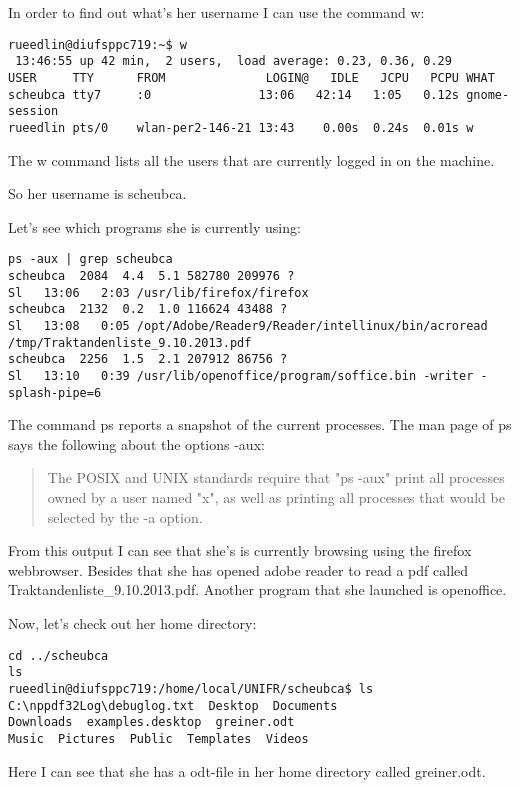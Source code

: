\documentclass[12pt]{article}
\begin{document}
In order to find out what's her username I can use the command w:
\begin{lstlisting}
rueedlin@diufsppc719:~$ w
 13:46:55 up 42 min,  2 users,  load average: 0.23, 0.36, 0.29
USER     TTY      FROM              LOGIN@   IDLE   JCPU   PCPU WHAT
scheubca tty7     :0               13:06   42:14   1:05   0.12s gnome-session
rueedlin pts/0    wlan-per2-146-21 13:43    0.00s  0.24s  0.01s w
\end{lstlisting}

The w command lists all the users that are currently logged in on the machine.

So her username is scheubca.

Let's see which programs she is currently using:

\begin{lstlisting}
ps -aux | grep scheubca
scheubca  2084  4.4  5.1 582780 209976 ?       
Sl   13:06   2:03 /usr/lib/firefox/firefox
scheubca  2132  0.2  1.0 116624 43488 ?        
Sl   13:08   0:05 /opt/Adobe/Reader9/Reader/intellinux/bin/acroread 
/tmp/Traktandenliste_9.10.2013.pdf
scheubca  2256  1.5  2.1 207912 86756 ?        
Sl   13:10   0:39 /usr/lib/openoffice/program/soffice.bin -writer -splash-pipe=6
\end{lstlisting}

The command ps reports a snapshot of the current processes. The man page of ps says the following about the options -aux:
\begin{quote}
The POSIX and UNIX standards require
       that "ps -aux" print all processes owned by a user named "x", as well as printing all
       processes that would be selected by the -a option. 
\end{quote}
 
From this output I can see that she's is currently browsing using the firefox webbrowser. Besides that she has opened adobe reader to read a pdf called Traktandenliste\_9.10.2013.pdf. Another program that she launched is openoffice.

Now, let's check out her home directory:
\begin{lstlisting}
cd ../scheubca
ls
rueedlin@diufsppc719:/home/local/UNIFR/scheubca$ ls
C:\nppdf32Log\debuglog.txt  Desktop  Documents  
Downloads  examples.desktop  greiner.odt  
Music  Pictures  Public  Templates  Videos
\end{lstlisting}

Here I can see that she has a odt-file in her home directory called greiner.odt.
\end{document}
